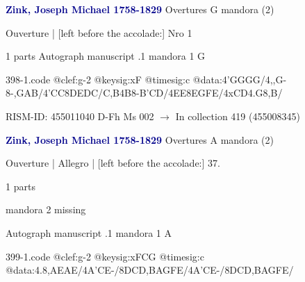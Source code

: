 \documentclass[twocolumn]{book}
\begin{document}
\newline \par \vspace{7pt} \textcolor{darkblue}{\textbf{Zink, Joseph Michael  1758-1829}}
\newline Overtures  G  
\newline mandora (2)
\newline \begin{itshape} Ouverture | [left before the accolade:] Nro 1\end{itshape} 
\newline \textcolor{darkblue}{}  1 parts  
\newline Autograph manuscript
.1  mandora 1  G  
\begin{filecontents*}{398-1.code}
@clef:g-2
@keysig:xF
@timesig:c
@data:4'GGGG/4,,G-8-{,GAB}/4'CC8DEDC/{C,B}4B8-{B'C}D/4EE{8EG}{FE}/4xCD4.G8,B/
\end{filecontents*}
\newline
%

\newline RISM-ID: 455011040
\newline D-Fh  Ms 002
\newline $\rightarrow$ In collection 419 (455008345)

\newline \par \vspace{7pt} \textcolor{darkblue}{\textbf{Zink, Joseph Michael  1758-1829}}
\newline Overtures  A  
\newline mandora (2)
\newline \begin{itshape}[f.21v, at left:] Ouverture | Allegro | [left before the accolade:] 37.\end{itshape} 
\newline \textcolor{darkblue}{}  1 parts  
\newline \begin{small} mandora 2 missing\end{small} 
\newline Autograph manuscript
.1  mandora 1  A  
\begin{filecontents*}{399-1.code}
@clef:g-2
@keysig:xFCG
@timesig:c
@data:4.8,AEAE/4A'CE-/{8DC}{D,B}{AG}{FE}/4A'CE-/{8DC}{D,B}{AG}{FE}/
\end{filecontents*}
\newline
%
\end{document}

